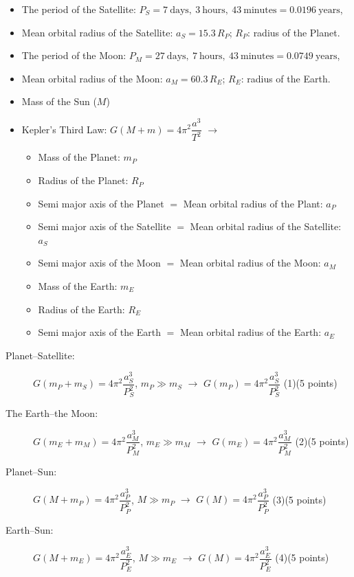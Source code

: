 \begin{itemize}
\item The period of the Satellite:
  $P_S = 7\ \text{days},\ 3\ \text{hours},\ 43\ \text{minutes}
   = 0.0196\ \text{years}$,
\item Mean orbital radius of the Satellite: $a_S = 15.3\,R_P$; $R_P$: radius
  of the Planet.
\item The period of the Moon:
  $P_M = 27\ \text{days},\ 7\ \text{hours},\ 43\ \text{minutes}
   = 0.0749\ \text{years}$,
\item Mean orbital radius of the Moon: $a_M = 60.3\,R_E$; $R_E$: radius of
  the Earth.
\item Mass of the Sun ($M$)
\item Kepler's Third Law: $G(M + m) = 4\pi^2 \dfrac{a^3}{T^2}$
  $\rightarrow$
  \begin{itemize}
  \item Mass of the Planet: $m_P$
  \item Radius of the Planet: $R_P$
  \item Semi major axis of the Planet $=$ Mean orbital radius of the
    Plant: %
    $a_P$
  \item Semi major axis of the Satellite $=$ Mean orbital radius of the
    Satellite: $a_S$
  \item Semi major axis of the Moon $=$ Mean orbital radius of the Moon:
    $a_M$
  \item Mass of the Earth: $m_E$
  \item Radius of the Earth: $R_E$
  \item Semi major axis of the Earth $=$ Mean orbital radius of the Earth:
    $a_E$
  \end{itemize}
\end{itemize}

\begin{description}
\item[Planet--Satellite:]
  $G(m_P + m_S) = 4\pi^2 \dfrac{a_S^3}{P_S^2}$, $m_P \gg m_S$
  $\rightarrow$ $G(m_P) = 4\pi^2 \dfrac{a_S^3}{P_S^2}$ \hfill(1)\quad(5 points)
\item[The Earth--the Moon:]
  $G(m_E + m_M) = 4\pi^2 \dfrac{a_M^3}{P_M^2}$, $m_E \gg m_M$
  $\rightarrow$ $G(m_E) = 4\pi^2 \dfrac{a_M^3}{P_M^2}$ \hfill(2)\quad(5 points)
\item[Planet--Sun:]
  $G(M + m_P) = 4\pi^2 \dfrac{a_P^3}{P_P^2}$, $M \gg m_P$
  $\rightarrow$ $G(M) = 4\pi^2 \dfrac{a_P^3}{P_P^2}$ \hfill(3)\quad(5 points)
\item[Earth--Sun:]
  $G(M + m_E) = 4\pi^2 \dfrac{a_E^3}{P_E^2}$, $M \gg m_E$
  $\rightarrow$ $G(M) = 4\pi^2 \dfrac{a_E^3}{P_E^2}$ \hfill(4)\quad(5 points)
\end{description}

